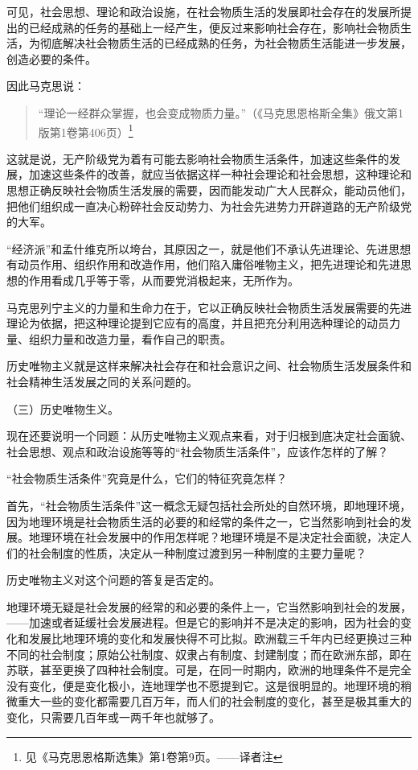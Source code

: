 可见，社会思想、理论和政治设施，在社会物质生活的发展即社会存在的发展所提出的已经成熟的任务的基础上一经产生，便反过来影响社会存在，影响社会物质生活，为彻底解决社会物质生活的已经成熟的任务，为社会物质生活能进一步发展，创造必要的条件。

因此马克思说：

\begin{quotation}
“理论一经群众掌握，也会变成物质力量。”（《马克思恩格斯全集》俄文第1版第1卷第406页）\footnote{见《马克思恩格斯选集》第1卷第9页。——译者注}
\end{quotation}

这就是说，无产阶级党为着有可能去影响社会物质生活条件，加速这些条件的发展，加速这些条件的改善，就应当依据这样一种社会理论和社会思想，这种理论和思想正确反映社会物质生活发展的需要，因而能发动广大人民群众，能动员他们，把他们组织成一直决心粉碎社会反动势力、为社会先进势力开辟道路的无产阶级党的大军。

“经济派”和孟什维克所以垮台，其原因之一，就是他们不承认先进理论、先进思想有动员作用、组织作用和改造作用，他们陷入庸俗唯物主义，把先进理论和先进思想的作用看成几乎等于零，从而要党消极起来，无所作为。

马克思列宁主义的力量和生命力在于，它以正确反映社会物质生活发展需要的先进理论为依据，把这种理论提到它应有的高度，并且把充分利用选种理论的动员力量、组织力量和改造力量，看作自己的职责。

历史唯物主义就是这样来解决社会存在和社会意识之间、社会物质生活发展条件和社会精神生活发展之同的关系问题的。

（三）历史唯物生义。

现在还要说明一个同题：从历史唯物主义观点来看，对于归根到底决定社会面貌、社会思想、观点和政治设施等等的“社会物质生活条件”，应该作怎样的了解？

“社会物质生活条件”究竟是什么，它们的特征究竟怎样？

首先，“社会物质生活条件”这一概念无疑包括社会所处的自然环境，即地理环境，因为地理环境是社会物质生活的必要的和经常的条件之一，它当然影响到社会的发展。地理环境在社会发展中的作用怎样呢？地理环境是不是决定社会面貌，决定人们的社会制度的性质，决定从一种制度过渡到另一种制度的主要力量呢？

历史唯物主义对这个问题的答复是否定的。

地理环境无疑是社会发展的经常的和必要的条件上一，它当然影响到社会的发展，——加速或者延缓社会发展进程。但是它的影响并不是决定的影响，因为社会的变化和发展比地理环境的变化和发展快得不可比拟。欧洲载三千年内已经更换过三种不同的社会制度；原始公社制度、奴隶占有制度、封建制度；而在欧洲东部，即在苏联，甚至更换了四种社会制度。可是，在同一时期内，欧洲的地理条件不是完全没有变化，便是变化极小，连地理学也不愿提到它。这是很明显的。地理环境的稍微重大一些的变化都需要几百万年，而人们的社会制度的变化，甚至是极其重大的变化，只需要几百年或一两千年也就够了。

